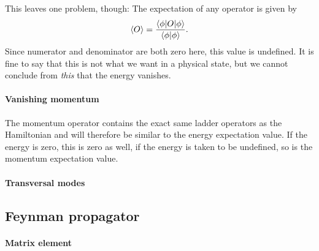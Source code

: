 \documentclass[11pt, english, fleqn, DIV=15, headinclude, BCOR=1cm]{scrartcl}
\begin{document}
This leaves one problem, though: The expectation of any operator is given by
\[
    \langle O \rangle = \frac{\braket{\phi | O | \phi}}{\braket{\phi | \phi}}.
\]
Since numerator and denominator are both zero here, this value is undefined. It
is fine to say that this is not what we want in a physical state, but we cannot
conclude from \emph{this} that the energy vanishes.

\paragraph{Vanishing momentum}

The momentum operator contains the exact same ladder operators as the
Hamiltonian and will therefore be similar to the energy expectation value. If
the energy is zero, this is zero as well, if the energy is taken to be
undefined, so is the momentum expectation value.

\paragraph{Transversal modes}


\subsection{Feynman propagator}

\paragraph{Matrix element}
\end{document}
